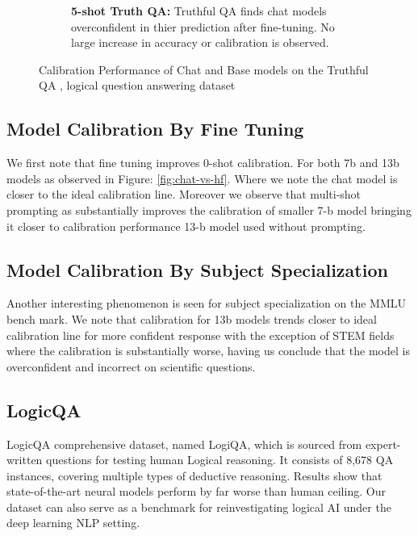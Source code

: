 \documentclass[11pt]{article}
\begin{document}
\begin{figure}
\begin{subfigure}[b]{0.49\textwidth}
         \caption{\textbf{5-shot Truth QA:} Truthful QA finds chat models overconfident in thier prediction after fine-tuning. No large increase in accuracy or calibration is observed.}
         \label{fig:5-shot-truthfulqa}
     \end{subfigure}     
        \caption{Calibration Performance of Chat and Base models on the Truthful QA , logical question answering dataset}
        \label{fig:three graphs}
\end{figure}



\subsection{Model Calibration By Fine Tuning}  

We first note that fine tuning improves 0-shot calibration. For both 7b and 13b models as observed in 
Figure: \ref{fig:chat-vs-hf}. Where we note the chat model is closer to the ideal calibration line. Moreover we observe that 
multi-shot prompting as substantially improves the calibration of smaller 7-b model bringing it closer to calibration performance 13-b model used without prompting.


\subsection{Model Calibration By Subject Specialization}  

Another interesting phenomenon is seen for subject specialization on the MMLU bench mark. We note that calibration for 13b models  trends closer to ideal calibration line for more confident response with the exception of STEM fields where the calibration is substantially worse, having us conclude that the model 
is overconfident and incorrect on scientific questions.


\subsection{LogicQA}

LogicQA comprehensive dataset, named LogiQA, which is sourced from expert-written questions for testing human Logical reasoning. It consists of 8,678 QA instances, covering multiple types of deductive reasoning. Results show that state-of-the-art neural models perform by far worse than human ceiling. Our dataset can also serve as a benchmark for reinvestigating logical AI under the deep learning NLP setting. 
\end{document}
